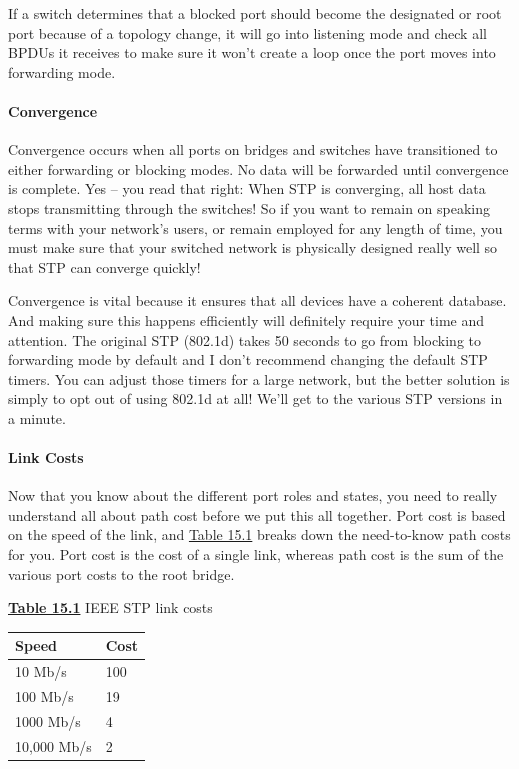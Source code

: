 If a switch determines that a blocked port should become the designated
or root port because of a topology change, it will go into listening
mode and check all BPDUs it receives to make sure it won't create a loop
once the port moves into forwarding mode.

\paragraph{Convergence}

Convergence occurs when all ports on bridges and switches have
transitioned to either forwarding or blocking modes. No data will be
forwarded until convergence is complete. Yes -- you read that right: When
STP is converging, all host data stops transmitting through the
switches! So if you want to remain on speaking terms with your network's
users, or remain employed for any length of time, you must make sure
that your switched network is physically designed really well so that
STP can converge quickly!

Convergence is vital because it ensures that all devices have a coherent
database. And making sure this happens efficiently will definitely
require your time and attention. The original STP (802.1d) takes 50
seconds to go from blocking to forwarding mode by default and I don't
recommend changing the default STP timers. You can adjust those timers
for a large network, but the better solution is simply to opt out of
using 802.1d at all! We'll get to the various STP versions in a minute.

\paragraph{Link Costs}

Now that you know about the different port roles and states, you need to
really understand all about path cost before we put this all together.
Port cost is based on the speed of the link, and
\protect\hyperlink{c15.xhtmlux5cux23table15-1}{Table 15.1} breaks down
the need-to-know path costs for you. Port cost is the cost of a single
link, whereas path cost is the sum of the various port costs to the root
bridge.



{\protect\hyperlink{c15.xhtmlux5cux23tableanchor15-1}{\textbf{Table
15.1}} IEEE STP link costs}

\begin{longtable}[]{@{}ll@{}}
\toprule
Speed & Cost\tabularnewline
\midrule
\endhead
10 Mb/s & 100\tabularnewline
100 Mb/s & 19\tabularnewline
1000 Mb/s & 4\tabularnewline
10,000 Mb/s & 2\tabularnewline
\bottomrule
\end{longtable}

